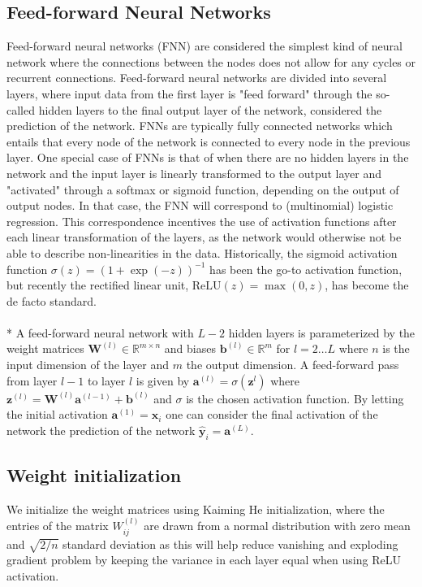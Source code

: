 \documentclass[a4paper,11pt]{article} %
\begin{document}
\subsection{Feed-forward Neural Networks}
Feed-forward neural networks (FNN) are considered the simplest kind of neural network where the connections between the nodes does not allow for any cycles or recurrent connections. Feed-forward neural networks are divided into several layers, where input data from the first layer is "feed forward" through the so-called hidden layers to the final output layer of the network, considered the prediction of the network. FNNs are typically fully connected networks which entails that every node of the network is connected to every node in the previous layer. One special case of FNNs is that of when there are no hidden layers in the network and the input layer is linearly transformed to the output layer and "activated" through a softmax or sigmoid function, depending on the output of output nodes. In that case, the FNN will correspond to (multinomial) logistic regression. This correspondence incentives the use of activation functions  after each linear transformation of the layers, as the network would otherwise not be able to describe non-linearities in the data. Historically, the sigmoid activation function $\sigma(z) = (1 + \exp(-z))^{-1}$ has been the go-to activation function, but recently the rectified linear unit, $\textrm{ReLU}(z) = \max(0, z)$, has become the de facto standard. \\
\\*
A feed-forward neural network with $L-2$ hidden layers is parameterized by the weight matrices $\mathbf{W}^{(l)} \in \mathbb{R}^{m \times n}$ and biases $\mathbf{b}^{(l)} \in  \mathbb{R}^{m}$ for $l = 2 \ldots L$ where $n$ is the input dimension of the layer and $m$ the output dimension. A feed-forward pass from layer $l-1$ to layer $l$ is given by $\mathbf{a}^{(l)} = \sigma(\mathbf{z}^{l})$ where $\mathbf{z}^{(l)} = \mathbf{W}^{(l)} \mathbf{a}^{(l-1)} + \mathbf{b}^{(l)}$ and $\sigma$ is the chosen activation function. By letting the initial activation $\mathbf{a}^{(1)} = \mathbf{x}_i$ one can consider the final activation of the network the prediction of the network $\mathbf{\hat{y}}_i = \mathbf{a}^{(L)}$.

\subsection{Weight initialization}
We initialize the weight matrices using Kaiming He initialization, where the entries of the matrix $W^{(l)}_{ij}$ are drawn from a normal distribution with zero mean and $\sqrt{2/n}$ standard deviation as this will help reduce vanishing and exploding gradient problem by keeping the variance in each layer equal when using ReLU activation. \cite{he2015delving}
\end{document}
